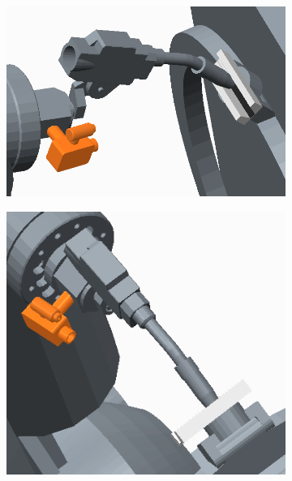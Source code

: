 \begin{figure}
\begin{subfigure}[b]{0.5\textwidth}
\includegraphics[width=\textwidth]{graphics/CAD1}
\label{}
\end{subfigure}
\begin{subfigure}[b]{0.5\textwidth}
\includegraphics[width=\textwidth]{graphics/CAD2}
\end{subfigure}
\begin{subfigure}[b]{0.3\textwidth}

\end{subfigure}
\end{figure}
